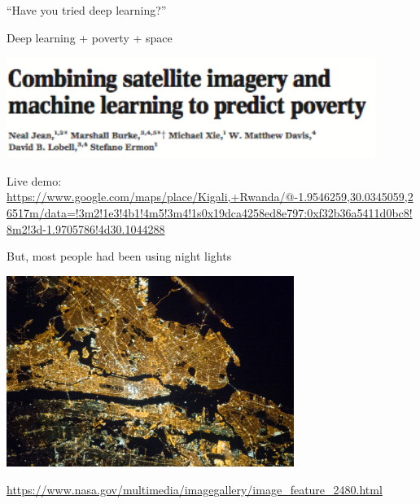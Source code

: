 \documentclass[aspectratio=169]{beamer}
\def\vf{\vfill}
\begin{document}
\begin{frame}

{\Large
\begin{center}
``Have you tried deep learning?''
\end{center}
}

\end{frame}
\begin{frame}

Deep learning + poverty + space

\begin{center}
\includegraphics[width=0.9\textwidth]{figures/jean_combining_2016_title}
\end{center}

\end{frame}
\begin{frame}

Live demo:
\url{https://www.google.com/maps/place/Kigali,+Rwanda/@-1.9546259,30.0345059,26517m/data=!3m2!1e3!4b1!4m5!3m4!1s0x19dca4258ed8e797:0xf32b36a5411d0bc8!8m2!3d-1.9705786!4d30.1044288}

\end{frame}
\begin{frame}

But, most people had been using night lights
\begin{center}
\includegraphics[width=0.7\textwidth]{figures/nyc_night}
\end{center}

\vf
\url{https://www.nasa.gov/multimedia/imagegallery/image_feature_2480.html}
\end{frame}
\end{document}
